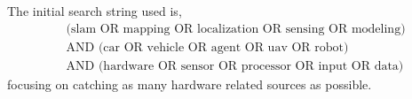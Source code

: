 The initial search string used is,
\begin{align}
    &\text{(slam OR mapping OR localization OR sensing OR modeling)} \nonumber \\ 
    &\text{AND (car OR vehicle OR agent OR uav OR robot)} \\
    &\text{AND (hardware OR sensor OR processor OR input OR data)} \nonumber
\end{align}
focusing on catching as many hardware related sources as possible.  
